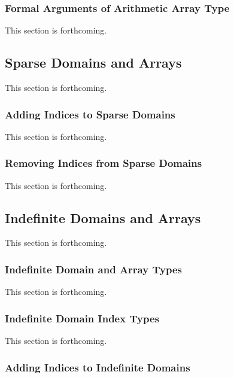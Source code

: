 \subsubsection{Formal Arguments of Arithmetic Array Type}
\label{Formal_Arguments_of_Arithmetic_Array_Type}

This section is forthcoming.

\subsection{Sparse Domains and Arrays}
\label{Sparse_Domains_and_Arrays}

This section is forthcoming.

\subsubsection{Adding Indices to Sparse Domains}
\label{Adding_Indices_to_Sparse_Domains}

This section is forthcoming.

\subsubsection{Removing Indices from Sparse Domains}
\label{Removing_Indices_from_Sparse_Domains}

This section is forthcoming.

\subsection{Indefinite Domains and Arrays}
\label{Indefinite_Domains_and_Arrays}

This section is forthcoming.

\subsubsection{Indefinite Domain and Array Types}
\label{Indefinite_Domain_and_Array_Types}

This section is forthcoming.

\subsubsection{Indefinite Domain Index Types}
\label{Indefinite_Domain_Index_Types}

This section is forthcoming.

\subsubsection{Adding Indices to Indefinite Domains}
\label{Adding_Indices_to_Indefinite_Domains}

